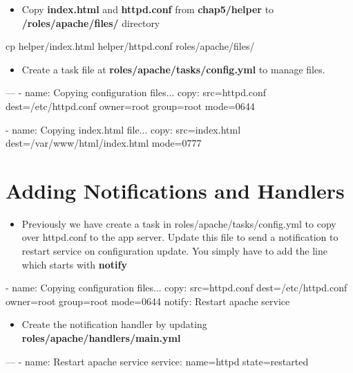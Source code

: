 \begin{itemize}
\item Copy \textbf{index.html} and \textbf{httpd.conf} from \textbf{chap5/helper} to \textbf{/roles/apache/files/} directory
\end{itemize}

\begin{code}
cp helper/index.html helper/httpd.conf roles/apache/files/  
\end{code}

\begin{itemize}
\item Create a task file at \textbf{roles/apache/tasks/config.yml} to manage files.
\end{itemize}

\begin{code}
---
- name: Copying configuration files...
  copy: src=httpd.conf
        dest=/etc/httpd.conf
        owner=root group=root mode=0644

- name: Copying index.html file...
  copy: src=index.html
        dest=/var/www/html/index.html
        mode=0777
\end{code}

\section{Adding Notifications and Handlers}

\begin{itemize}
\item Previously we have create a task in roles/apache/tasks/config.yml to copy over httpd.conf to the app server. Update this file to send a notification to restart  service on configuration update.  You simply have to add the line which starts with \textbf{notify}
\end{itemize}

\begin{code}
- name: Copying configuration files...
  copy: src=httpd.conf
        dest=/etc/httpd.conf
        owner=root group=root mode=0644
  notify: Restart apache service
\end{code}

\begin{itemize}
\item Create the notification handler by updating   \textbf{roles/apache/handlers/main.yml}
\end{itemize}

\begin{code}
---
- name: Restart apache service
  service: name=httpd state=restarted
\end{code}

